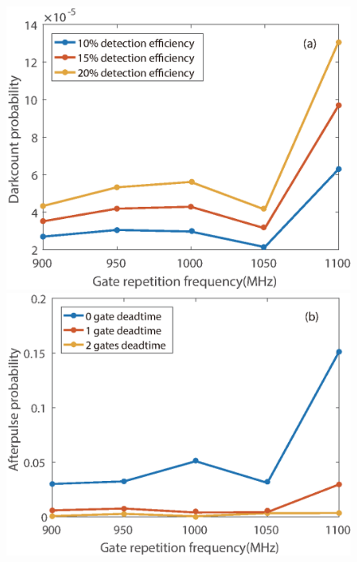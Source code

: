 \documentclass[%
 reprint,
superscriptaddress,
 amsmath,amssymb,
 aps,
]{revtex4-1}
\begin{document}
\begin{figure}
\begin{minipage}{0.45\linewidth}
\centering
\includegraphics[width = 1\textwidth]{figure/darkcount_rate.eps}%
\end{minipage}
\begin{minipage}{0.45\linewidth}
\centering
\includegraphics[width = 1\textwidth]{figure/afterpulse_rate_10percent_efficiency.eps}%
\end{minipage}
\begin{minipage}{0.45\linewidth}

\end{minipage}
\end{figure}
\end{document}
